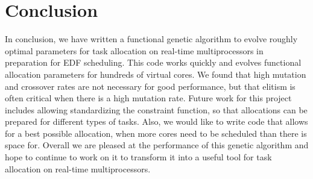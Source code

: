 \documentclass[11pt]{article}
\begin{document}
\section{Conclusion}

In conclusion, we have written a functional genetic algorithm to evolve roughly optimal parameters for task allocation on real-time multiprocessors in preparation for EDF scheduling. This code works quickly and evolves functional allocation parameters for hundreds of virtual cores. We found that high mutation and crossover rates are not necessary for good performance, but that elitism is often critical when there is a high mutation rate. Future work for this project includes allowing standardizing the constraint function, so that allocations can be prepared for different types of tasks. Also, we would like to write code that allows for a best possible allocation, when more cores need to be scheduled than there is space for. Overall we are pleased at the performance of this genetic algorithm and hope to continue to work on it to transform it into a useful tool for task allocation on real-time multiprocessors.

\singlespacing


\end{document}
